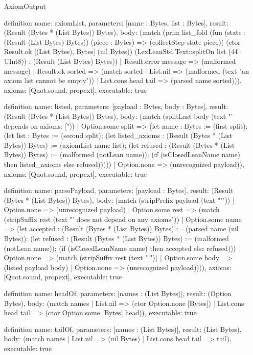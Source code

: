 \begin{lexlean}{AxiomOutput}
\begin{semanticmodule}
definition{
  name: axiomList,
  parameters: [name : Bytes, list : Bytes],
  result: (Result (Bytes * (List Bytes)) Bytes),
  body: (match (prim list_fold (fun (state : (Result (List Bytes) Bytes)) (piece : Bytes) => (collectStep state piece)) (ctor Result.ok [(List Bytes), Bytes] (nil Bytes)) (LexLeanStd.Text::splitOn list (44 : UInt8)) : (Result (List Bytes) Bytes))
    | Result.error message => (malformed message)
    | Result.ok sorted => (match sorted
      | List.nil => (malformed (text "an axiom list cannot be empty"))
      | List.cons head tail => (parsed name sorted))),
  axioms: [Quot.sound, propext],
  executable: true
}

definition{
  name: listed,
  parameters: [payload : Bytes, body : Bytes],
  result: (Result (Bytes * (List Bytes)) Bytes),
  body: (match (splitLast body (text "' depends on axioms: ["))
    | Option.some split => (let name : Bytes := (first split); (let list : Bytes := (second split); (let listed_axioms : (Result (Bytes * (List Bytes)) Bytes) := (axiomList name list); (let refused : (Result (Bytes * (List Bytes)) Bytes) := (malformed (notLean name)); (if (isClosedLeanName name) then listed_axioms else refused)))))
    | Option.none => (unrecognized payload)),
  axioms: [Quot.sound, propext],
  executable: true
}

definition{
  name: parsePayload,
  parameters: [payload : Bytes],
  result: (Result (Bytes * (List Bytes)) Bytes),
  body: (match (stripPrefix payload (text "'"))
    | Option.none => (unrecognized payload)
    | Option.some rest => (match (stripSuffix rest (text "' does not depend on any axioms"))
      | Option.some name => (let accepted : (Result (Bytes * (List Bytes)) Bytes) := (parsed name (nil Bytes)); (let refused : (Result (Bytes * (List Bytes)) Bytes) := (malformed (notLean name)); (if (isClosedLeanName name) then accepted else refused)))
      | Option.none => (match (stripSuffix rest (text "]"))
        | Option.some body => (listed payload body)
        | Option.none => (unrecognized payload)))),
  axioms: [Quot.sound, propext],
  executable: true
}

definition{
  name: headOf,
  parameters: [names : (List Bytes)],
  result: (Option Bytes),
  body: (match names
    | List.nil => (ctor Option.none [Bytes])
    | List.cons head tail => (ctor Option.some [Bytes] head)),
  executable: true
}

definition{
  name: tailOf,
  parameters: [names : (List Bytes)],
  result: (List Bytes),
  body: (match names | List.nil => (nil Bytes) | List.cons head tail => tail),
  executable: true
}


\end{semanticmodule}
\end{lexlean}
